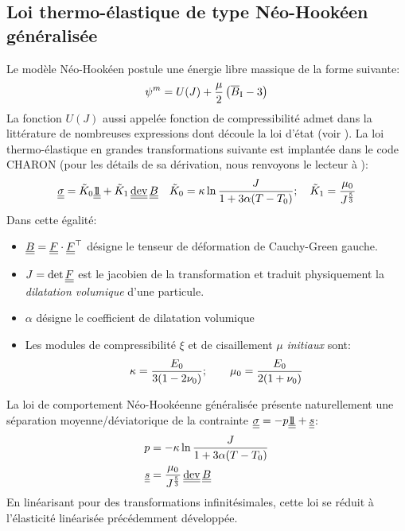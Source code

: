 \documentclass[10pt]{book}
\begin{document}
\begin{appendices}
\subsection{Loi thermo-élastique de type Néo-Hookéen généralisée}
Le modèle Néo-Hookéen postule une énergie libre massique de la forme suivante:
$$\psi^{m} = U(J) + \dfrac{\mu}{2}\left(\overline{B}_{\mathrm{I}} -3\right)$$
La fonction $U(J)$ aussi appelée fonction de compressibilité admet dans la littérature de nombreuses expressions dont découle la loi d'état (voir ). La loi thermo-élastique en grandes transformations suivante est implantée dans le code CHARON (pour les détails de sa dérivation, nous renvoyons le lecteur à \cite{simo2006computational}):
\begin{equation}
\SC=\tilde{K}_{0}\TU+\tilde{K}_{1}\dev\CGG \quad \tilde{K}_{0}=\BulkModulus\ln\frac{\J}{1+3\alpha(T-T_{0})}; \quad \tilde{K}_{1}=\frac{\mu_{0}}{\J^{\frac{5}{3}}}
\label{eq:loi_grand_transfo}
\end{equation}
Dans cette égalité:
\begin{itemize}
\item $\underline{\underline{B}}=\underline{\underline{F}}\cdot\underline{\underline{F}}^{\top}$ désigne le tenseur de déformation de Cauchy-Green gauche.
\item $J=\det\underline{\underline{F}}$ est le jacobien de la transformation et traduit physiquement la \emph{dilatation volumique} d'une particule.
\item $\alpha$ désigne le coefficient de dilatation volumique 
\item Les modules de compressibilité $\xi$ et de cisaillement $\mu$ {\it initiaux} sont:
$$\kappa=\frac{E_{0}}{3(1-2\nu_{0})}; \qquad \mu_{0}=\frac{E_{0}}{2(1+\nu_{0})}$$
\end{itemize}
La loi de comportement Néo-Hookéenne généralisée présente naturellement une séparation moyenne/déviatorique de la contrainte $\underline{\underline{\sigma}} = -p\underline{\underline{1\!\!1}}+\underline{\underline{s}}$:
\begin{align}
p &= -\BulkModulus\ln\frac{\J}{1+3\alpha(T-T_{0})}\\\label{eq:devia_Neo_Hook}
\devia &= \frac{\mu_{0}}{\J^{\frac{5}{3}}}\dev\CGG
\end{align}
En linéarisant pour des transformations infinitésimales, cette loi se réduit à l'élasticité linéarisée précédemment développée.\\


\end{appendices}
\end{document}
